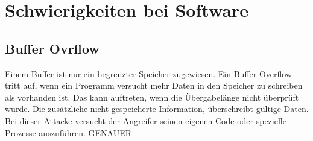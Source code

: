 \documentclass[11pt]{scrartcl}
\begin{document}
\section{Schwierigkeiten bei Software}
\label{sec:sw-trouble}

\subsection{Buffer Ovrflow}
\label{sec:buffer-overflow}
Einem Buffer ist nur ein begrenzter Speicher zugewiesen. Ein Buffer Overflow tritt auf, wenn ein Programm versucht mehr Daten in den Speicher zu schreiben als vorhanden ist. Das kann auftreten, wenn die Übergabelänge nicht überprüft wurde. Die zusätzliche nicht gespeicherte Information, überschreibt gültige Daten. Bei dieser Attacke versucht der Angreifer seinen eigenen Code oder spezielle Prozesse auszuführen. GENAUER \cite{9}
\end{document}
